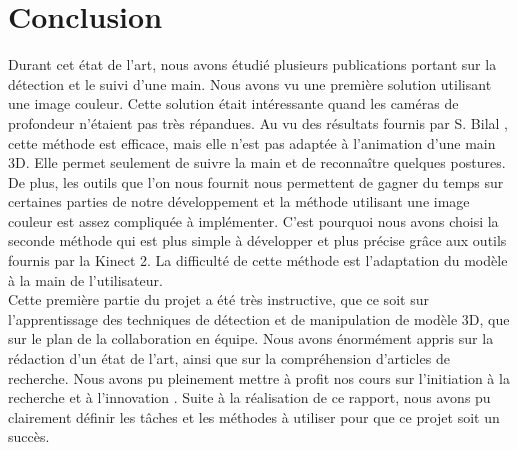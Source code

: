 \chapter*{Conclusion}
Durant cet état de l'art, nous avons étudié plusieurs publications portant sur la détection et le suivi
d'une main. Nous avons vu une première solution utilisant une image couleur. Cette solution était
intéressante quand les caméras de profondeur n'étaient pas très répandues. Au vu des résultats fournis par S. Bilal
\cite{haarlike}, cette méthode est efficace, mais elle n'est pas adaptée à l'animation d'une main 3D. Elle permet seulement
de suivre la main et de reconnaître quelques postures. De plus, les outils que l'on nous fournit nous permettent
de gagner du temps sur certaines parties de notre développement et la méthode utilisant une image couleur
est assez compliquée à implémenter. C'est pourquoi nous avons choisi la seconde méthode qui est plus
simple à développer et plus précise grâce aux outils fournis par la Kinect 2. La difficulté de cette méthode
est l'adaptation du modèle à la main de l'utilisateur.\\


Cette première partie du projet a été très instructive, que ce soit sur l'apprentissage des techniques de détection et de manipulation
de modèle 3D, que sur le plan de la collaboration en équipe. Nous avons énormément appris sur la rédaction d'un
état de l'art, ainsi que sur la compréhension d'articles de recherche. Nous avons pu pleinement mettre à profit
nos cours sur \og l'initiation à la recherche et à l'innovation \fg. Suite à la réalisation de ce rapport, nous avons pu
clairement définir les tâches et les méthodes à utiliser pour que ce projet soit un succès. 
